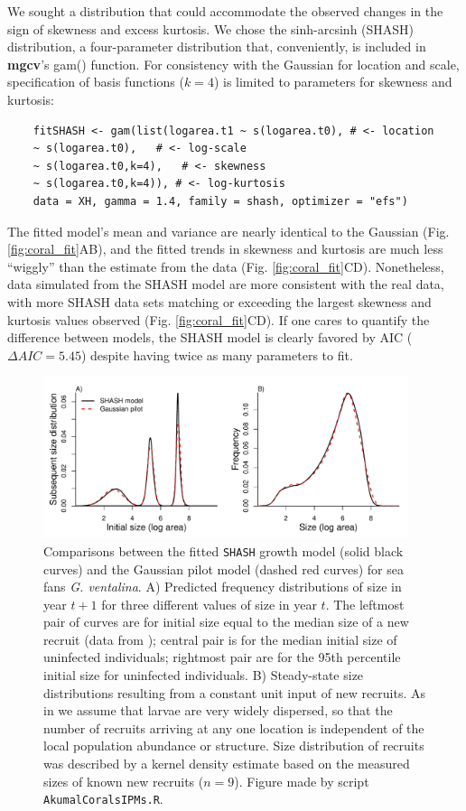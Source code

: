 \documentclass[12pt]{article}
\begin{document}
\begin{spacing}{1.35}
We sought a distribution that could accommodate the observed changes in the sign of skewness and excess kurtosis. We chose the sinh-arcsinh (SHASH) distribution, a four-parameter distribution that, 
conveniently, is included in \textbf{mgcv}'s gam() function. 
For consistency with the Gaussian for location and scale, specification of basis functions ($k=4$) is limited to parameters for skewness and kurtosis:
\begin{lstlisting}
	fitSHASH <- gam(list(logarea.t1 ~ s(logarea.t0), # <- location 
	~ s(logarea.t0),   # <- log-scale
	~ s(logarea.t0,k=4),   # <- skewness
	~ s(logarea.t0,k=4)), # <- log-kurtosis
	data = XH, gamma = 1.4, family = shash, optimizer = "efs")
\end{lstlisting}
The fitted model's mean and variance are nearly identical to the Gaussian (Fig. \ref{fig:coral_fit}AB), and the fitted trends in skewness and kurtosis are much less ``wiggly'' than the estimate from the data (Fig. \ref{fig:coral_fit}CD). 
Nonetheless, data simulated from the SHASH model are more consistent with the real data, with more SHASH data sets matching or exceeding the largest skewness and kurtosis values observed (Fig. \ref{fig:coral_fit}CD). 
If one cares to quantify the difference between models, the SHASH model is clearly favored by AIC ($\Delta AIC = 5.45$) despite having twice as many parameters to fit. 

\begin{figure}[tbp]
	\centering
	\includegraphics[width=0.95\textwidth]{figures/CoralKernelCompare_v2.pdf}
	\caption{Comparisons between the fitted \texttt{SHASH} growth model (solid black curves) and the Gaussian pilot model (dashed red curves)
		for sea fans \emph{G. ventalina}. A) Predicted frequency distributions of size in year $t+1$ for three different values of size in 
		year $t$. The leftmost pair of curves are for initial size equal to the median size of a new recruit (data from \citep{bruno-etal-2011}); 
		central pair is for the median initial size of uninfected individuals; rightmost pair are for the 95th percentile initial size for uninfected
		individuals. B) Steady-state size distributions resulting from a constant unit input of new recruits. As in \citet{bruno-etal-2011} we
		assume that larvae are very widely dispersed, so that the number of recruits arriving at any one location is independent of the local population
		abundance or structure. Size distribution of recruits was described by a kernel density estimate based on the measured sizes
		of known new recruits ($n=9$). Figure made by script \texttt{AkumalCoralsIPMs.R}.}
	\label{fig:CoralKernelCompare}
\end{figure}   


\end{spacing}
\end{document}
